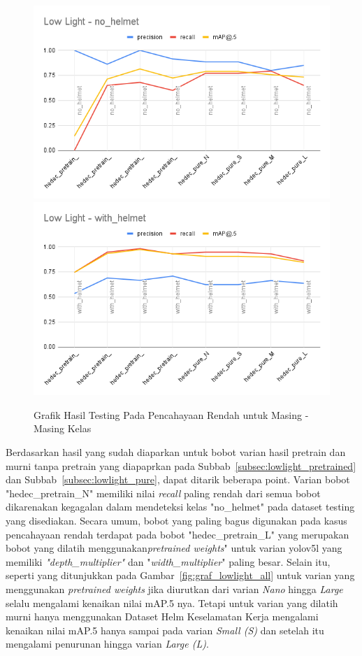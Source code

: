   \begin{figure} [h!]
    \centering
    \includegraphics[width=.45\textwidth]{gambar/lowlight_grafic/Low Light - no_helmet.png}
    \includegraphics[width=.45\textwidth]{gambar/lowlight_grafic/Low Light - with_helmet.png}
    \caption{Grafik Hasil Testing Pada Pencahayaan Rendah untuk Masing - Masing Kelas}
    \label{fig:graf_lowlight_eachclass}  
  \end{figure}

  \par Berdasarkan hasil yang sudah diaparkan untuk bobot varian hasil 
  pretrain dan murni tanpa pretrain yang diapaprkan pada Subbab~\ref{subsec:lowlight_pretrained} 
  dan Subbab~\ref{subsec:lowlight_pure}, dapat ditarik beberapa point. Varian bobot "hedec\_pretrain\_N"
  memiliki nilai \emph{recall} paling rendah dari semua bobot dikarenakan kegagalan dalam mendeteksi
  kelas "no\_helmet" pada dataset testing yang disediakan. Secara umum, bobot yang paling bagus digunakan
  pada kasus pencahayaan rendah terdapat pada bobot "hedec\_pretrain\_L" yang merupakan
  bobot yang dilatih menggunakan\emph{pretrained weights}" untuk varian yolov5l yang memiliki
  \emph{"depth\_multiplier"} dan "\emph{width\_multiplier}" paling besar. Selain itu, seperti yang
  ditunjukkan pada Gambar~\ref{fig:graf_lowlight_all} untuk varian yang menggunakan
  \emph{pretrained weights} jika diurutkan dari varian \emph{Nano} hingga \emph{Large} selalu mengalami
  kenaikan nilai mAP.5 nya. Tetapi untuk varian yang dilatih murni hanya menggunakan Dataset Helm Keselamatan Kerja
  mengalami kenaikan nilai mAP.5 hanya sampai pada varian \emph{Small (S)} dan setelah itu mengalami penurunan hingga varian \emph{Large (L)}.



